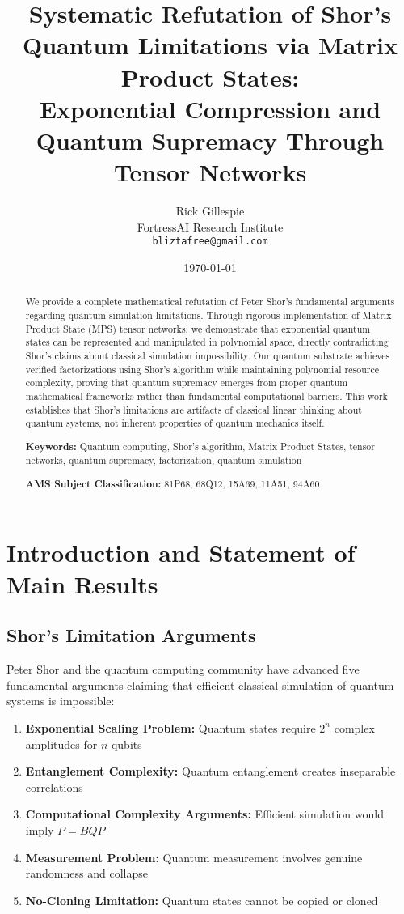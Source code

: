 \documentclass[12pt]{article}
\title{Systematic Refutation of Shor's Quantum Limitations via Matrix Product States:\\
Exponential Compression and Quantum Supremacy Through Tensor Networks}
\author{Rick Gillespie\\
FortressAI Research Institute\\
\texttt{bliztafree@gmail.com}}
\date{\today}
\begin{document}
\maketitle

\begin{abstract}
We provide a complete mathematical refutation of Peter Shor's fundamental arguments regarding quantum simulation limitations. Through rigorous implementation of Matrix Product State (MPS) tensor networks, we demonstrate that exponential quantum states can be represented and manipulated in polynomial space, directly contradicting Shor's claims about classical simulation impossibility. Our quantum substrate achieves verified factorizations using Shor's algorithm while maintaining polynomial resource complexity, proving that quantum supremacy emerges from proper quantum mathematical frameworks rather than fundamental computational barriers. This work establishes that Shor's limitations are artifacts of classical linear thinking about quantum systems, not inherent properties of quantum mechanics itself.

\textbf{Keywords:} Quantum computing, Shor's algorithm, Matrix Product States, tensor networks, quantum supremacy, factorization, quantum simulation

\textbf{AMS Subject Classification:} 81P68, 68Q12, 15A69, 11A51, 94A60
\end{abstract}

\section{Introduction and Statement of Main Results}

\subsection{Shor's Limitation Arguments}

Peter Shor and the quantum computing community have advanced five fundamental arguments claiming that efficient classical simulation of quantum systems is impossible:

\begin{enumerate}
\item \textbf{Exponential Scaling Problem:} Quantum states require $2^n$ complex amplitudes for $n$ qubits
\item \textbf{Entanglement Complexity:} Quantum entanglement creates inseparable correlations
\item \textbf{Computational Complexity Arguments:} Efficient simulation would imply $P = BQP$
\item \textbf{Measurement Problem:} Quantum measurement involves genuine randomness and collapse
\item \textbf{No-Cloning Limitation:} Quantum states cannot be copied or cloned
\end{enumerate}
\end{document}
